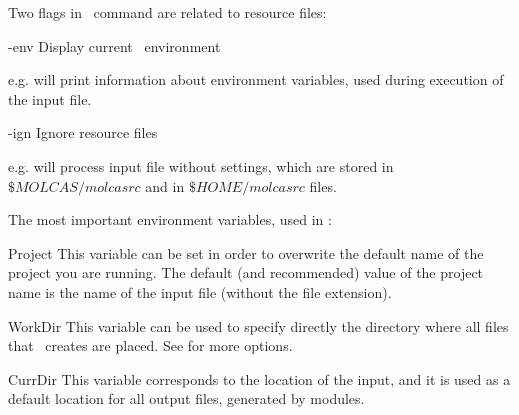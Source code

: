 Two flags in \molcas\ command are related to resource files:
\begin{variablelist}
\item[-env]
Display current \molcas\ environment

e.g.  will print information about environment
variables, used during execution of the input file.

\item[-ign]
Ignore resource files

e.g.  will process input file without settings,
which are stored in $\$MOLCAS/molcasrc$ and in $\$HOME/molcasrc$ files.
\end{variablelist}


The most important environment variables, used in \molcas:
\begin{variablelist}
\item[Project]
This variable can be set in order to overwrite the default name of the
project you are running. The default (and recommended) value of the project name is the
name of the input file (without the file extension).
\item[WorkDir]
This variable can be used to specify directly the directory where all files
that \molcas\ creates are placed. See  for more options.
\item[CurrDir]
This variable corresponds to the location of the input, and it is used as
a default location for all output files, generated by \molcas modules.

\end{variablelist}
